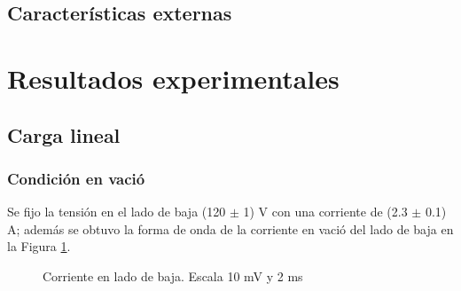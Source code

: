 \documentclass[11pt,letterpaper]{article}     %
\begin{document}
\subsection{Características externas}

\section{Resultados experimentales}



\subsection{Carga lineal}
\subsubsection{Condición en vació}
Se fijo la tensión en el lado de baja (120 $\pm$ 1) V con una corriente de (2.3 $\pm$ 0.1) A; además se obtuvo la forma de onda de la corriente en vació del lado de baja en la Figura \ref{ShuntEnVacio}.
\begin{figure}[H]
    \centering
    \caption{Corriente en lado de baja. Escala 10 mV y 2 ms }
    \label{ShuntEnVacio}
\end{figure}
\end{document}
